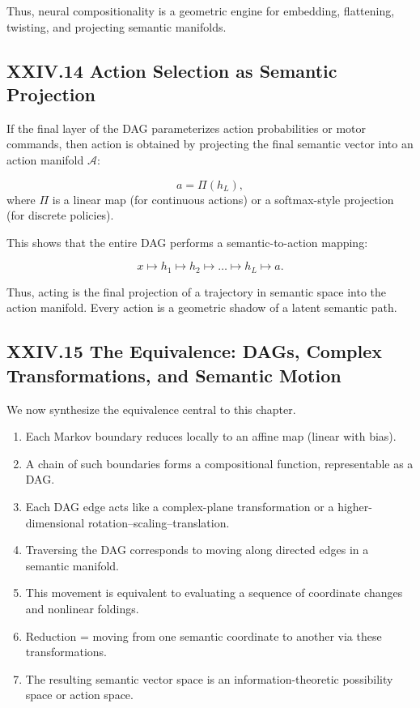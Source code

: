 \documentclass[12pt,letterpaper]{article}
\begin{document}
Thus, neural compositionality is a geometric engine for embedding, flattening, twisting, and projecting semantic manifolds.

\subsection{XXIV.14 Action Selection as Semantic Projection}

If the final layer of the DAG parameterizes action probabilities or motor commands, then action is obtained by projecting the final semantic vector into an action manifold $\mathcal{A}$:

\[
a = \Pi( h_L ),
\]
where $\Pi$ is a linear map (for continuous actions) or a softmax-style projection (for discrete policies).

This shows that the entire DAG performs a semantic-to-action mapping:

\[
x \mapsto h_1 \mapsto h_2 \mapsto \dots \mapsto h_L \mapsto a.
\]

Thus, acting is the final projection of a trajectory in semantic space into the action manifold.  
Every action is a geometric shadow of a latent semantic path.

\subsection{XXIV.15 The Equivalence: DAGs, Complex Transformations, and Semantic Motion}

We now synthesize the equivalence central to this chapter.

\begin{enumerate}
    \item Each Markov boundary reduces locally to an affine map (linear with bias).
    \item A chain of such boundaries forms a compositional function, representable as a DAG.
    \item Each DAG edge acts like a complex-plane transformation or a higher-dimensional rotation–scaling–translation.
    \item Traversing the DAG corresponds to moving along directed edges in a semantic manifold.
    \item This movement is equivalent to evaluating a sequence of coordinate changes and nonlinear foldings.
    \item Reduction = moving from one semantic coordinate to another via these transformations.
    \item The resulting semantic vector space is an information-theoretic possibility space or action space.
\end{enumerate}
\end{document}
